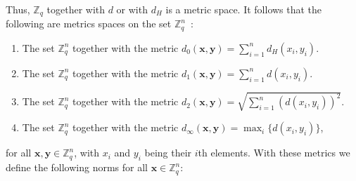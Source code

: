 \documentclass[pdflatex,sn-mathphys-num]{sn-jnl}
\theoremstyle{definition}
\newcommand{\vtr}[1]{\mathbf{#1}}
\begin{document}
Thus, $\mathbb{Z}_q$ together with $d$ or with $d_H$ is a metric space. It follows that the following are metrics spaces on the set $\mathbb{Z}_q^n$~\cite[\S 1.6]{searcoid-metric}:
\begin{enumerate}
    \item The set $\mathbb{Z}_q^n$ together with the metric $d_0(\vtr{x}, \vtr{y}) = \sum_{i=1}^n d_H(x_i, y_i)$.
    \item The set $\mathbb{Z}_q^n$ together with the metric $d_1(\vtr{x}, \vtr{y}) = \sum_{i=1}^n d(x_i, y_i)$.
    \item The set $\mathbb{Z}_q^n$ together with the metric $d_2(\vtr{x}, \vtr{y}) = \sqrt{\sum_{i=1}^n (d(x_i, y_i))^2}$.
    \item The set $\mathbb{Z}_q^n$ together with the metric $d_\infty(\vtr{x}, \vtr{y}) = \max_{i} \{d(x_i, y_i)\}$,
\end{enumerate}
for all $\mathbf{x}, \mathbf{y} \in \mathbb{Z}_q^n$, with $x_i$ and $y_i$ being their $i$th elements. With these metrics we define the following norms for all $\mathbf{x} \in \mathbb{Z}_q^n$:
\end{document}
